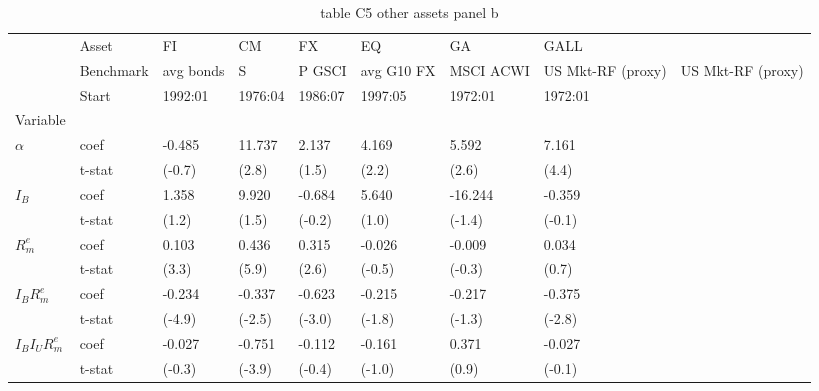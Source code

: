 \begin{table}[htbp]
  \centering
  \caption{table C5 other assets panel b}
  \label{tab:table_C5_other_assets_panel_b}
  \begin{tabular}{llllllll}
\toprule
 & Asset & FI & CM & FX & EQ & GA & GALL \\
 & Benchmark & avg bonds & S&P GSCI & avg G10 FX & MSCI ACWI & US Mkt-RF (proxy) & US Mkt-RF (proxy) \\
 & Start & 1992:01 & 1976:04 & 1986:07 & 1997:05 & 1972:01 & 1972:01 \\
Variable &  &  &  &  &  &  &  \\
\midrule
{} & coef & -0.485 & 11.737 & 2.137 & 4.169 & 5.592 & 7.161 \\
 & t-stat & (-0.7) & (2.8) & (1.5) & (2.2) & (2.6) & (4.4) \\
 & coef & 1.358 & 9.920 & -0.684 & 5.640 & -16.244 & -0.359 \\
 & t-stat & (1.2) & (1.5) & (-0.2) & (1.0) & (-1.4) & (-0.1) \\
 & coef & 0.103 & 0.436 & 0.315 & -0.026 & -0.009 & 0.034 \\
 & t-stat & (3.3) & (5.9) & (2.6) & (-0.5) & (-0.3) & (0.7) \\
 & coef & -0.234 & -0.337 & -0.623 & -0.215 & -0.217 & -0.375 \\
 & t-stat & (-4.9) & (-2.5) & (-3.0) & (-1.8) & (-1.3) & (-2.8) \\
 & coef & -0.027 & -0.751 & -0.112 & -0.161 & 0.371 & -0.027 \\
 & t-stat & (-0.3) & (-3.9) & (-0.4) & (-1.0) & (0.9) & (-0.1) \\
\bottomrule
\end{tabular}

\end{table}

